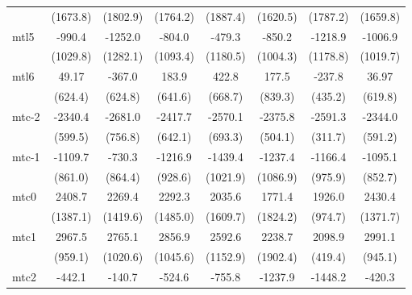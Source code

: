 \documentclass{article}
\begin{document}
{\begin{longtable}{l*{7}{c}}
                & (1673.8)         & (1802.9)         & (1764.2)         & (1887.4)         & (1620.5)         & (1787.2)         & (1659.8)         \\
mtl5            &   -990.4         &  -1252.0         &   -804.0         &   -479.3         &   -850.2         &  -1218.9         &  -1006.9         \\
                & (1029.8)         & (1282.1)         & (1093.4)         & (1180.5)         & (1004.3)         & (1178.8)         & (1019.7)         \\
mtl6            &    49.17         &   -367.0         &    183.9         &    422.8         &    177.5         &   -237.8         &    36.97         \\
                &  (624.4)         &  (624.8)         &  (641.6)         &  (668.7)         &  (839.3)         &  (435.2)         &  (619.8)         \\
mtc-2           &  -2340.4\sym{*}  &  -2681.0\sym{*}  &  -2417.7\sym{*}  &  -2570.1\sym{*}  &  -2375.8\sym{**} &  -2591.3\sym{***}&  -2344.0\sym{*}  \\
                &  (599.5)         &  (756.8)         &  (642.1)         &  (693.3)         &  (504.1)         &  (311.7)         &  (591.2)         \\
mtc-1           &  -1109.7         &   -730.3         &  -1216.9         &  -1439.4         &  -1237.4         &  -1166.4         &  -1095.1         \\
                &  (861.0)         &  (864.4)         &  (928.6)         & (1021.9)         & (1086.9)         &  (975.9)         &  (852.7)         \\
mtc0            &   2408.7         &   2269.4         &   2292.3         &   2035.6         &   1771.4         &   1926.0         &   2430.4         \\
                & (1387.1)         & (1419.6)         & (1485.0)         & (1609.7)         & (1824.2)         &  (974.7)         & (1371.7)         \\
mtc1            &   2967.5\sym{*}  &   2765.1\sym{*}  &   2856.9\sym{*}  &   2592.6         &   2238.7         &   2098.9\sym{**} &   2991.1\sym{*}  \\
                &  (959.1)         & (1020.6)         & (1045.6)         & (1152.9)         & (1902.4)         &  (419.4)         &  (945.1)         \\
mtc2            &   -442.1         &   -140.7         &   -524.6         &   -755.8         &  -1237.9         &  -1448.2         &   -420.3         \\

\end{longtable}}
\end{document}
